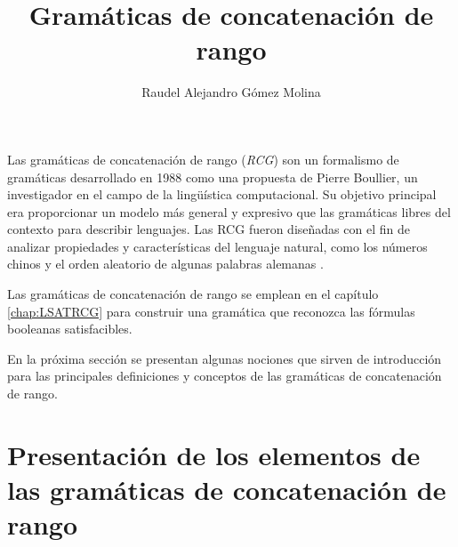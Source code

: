 \documentclass[12pt]{article}
\title{Gramáticas de concatenación de rango}
\author{Raudel Alejandro Gómez Molina}
\begin{document}
\maketitle






Las gramáticas de concatenación de rango (\textit{RCG}) \cite{mainRCGBib} son un formalismo de gramáticas desarrollado 
en 1988 como una propuesta de Pierre Boullier, un investigador en el campo de la lingüística computacional. Su objetivo 
principal era proporcionar un modelo más general y expresivo que las gramáticas libres del contexto para describir 
lenguajes.  Las RCG fueron diseñadas con el fin de analizar propiedades y características del lenguaje natural, como los números
chinos y el orden aleatorio de algunas palabras alemanas \cite{boullier1999chinese}.

Las gramáticas de concatenación de rango se emplean en el capítulo \ref{chap:LSATRCG} para construir una gramática que reconozca las fórmulas booleanas satisfacibles.

En la próxima sección se presentan algunas nociones que sirven de introducción para las principales definiciones y conceptos de las gramáticas de concatenación de rango.

\section{Presentación de los elementos de las gramáticas de concatenación de rango}
\end{document}
